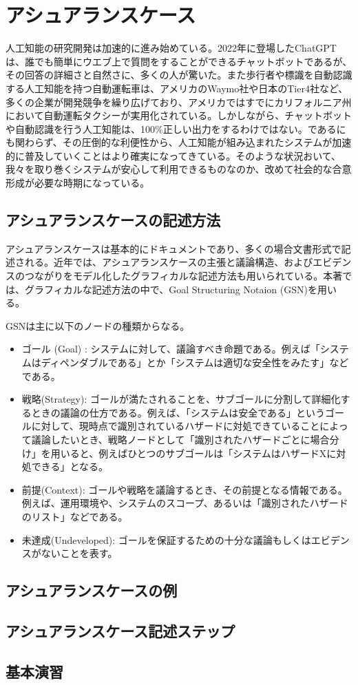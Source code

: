 \chapter{アシュアランスケース}
\label{chap5}

人工知能の研究開発は加速的に進み始めている。2022年に登場したChatGPTは、誰でも簡単にウエブ上で質問をすることができるチャットボットであるが、その回答の詳細さと自然さに、多くの人が驚いた。また歩行者や標識を自動認識する人工知能を持つ自動運転車は、アメリカのWaymo社や日本のTier4社など、多くの企業が開発競争を繰り広げており、アメリカではすでにカリフォルニア州において自動運転タクシーが実用化されている。しかしながら、チャットボットや自動認識を行う人工知能は、100\%正しい出力をするわけではない。であるにも関わらず、その圧倒的な利便性から、人工知能が組み込まれたシステムが加速的に普及していくことはより確実になってきている。そのような状況おいて、我々を取り巻くシステムが安心して利用できるものなのか、改めて社会的な合意形成が必要な時期になっている。

\section{アシュアランスケースの記述方法}
アシュアランスケースは基本的にドキュメントであり、多くの場合文書形式で記述される。近年では、アシュアランスケースの主張と議論構造、およびエビデンスのつながりをモデル化したグラフィカルな記述方法も用いられている。本著では、グラフィカルな記述方法の中で、Goal Structuring Notaion (GSN)を用いる。

GSNは主に以下のノードの種類からなる。
\begin{itemize}
\item ゴール (Goal) : 
システムに対して、議論すべき命題である。例えば「システムはディペンダブルである」とか「システムは適切な安全性をみたす」などである。
\item 戦略(Strategy): ゴールが満たされることを、サブゴールに分割して詳細化するときの議論の仕方である。例えば、「システムは安全である」というゴールに対して、現時点で識別されているハザードに対処できていることによって議論したいとき、戦略ノードとして「識別されたハザードごとに場合分け」を用いると、例えばひとつのサブゴールは「システムはハザードXに対処できる」となる。
\item 前提(Context): ゴールや戦略を議論するとき、その前提となる情報である。例えば、運用環境や、システムのスコープ、あるいは「識別されたハザードのリスト」などである。
\item 未達成(Undeveloped): ゴールを保証するための十分な議論もしくはエビデンスがないことを表す。
\end{itemize}
\section{アシュアランスケースの例}
\section{アシュアランスケース記述ステップ}

\section{基本演習}
